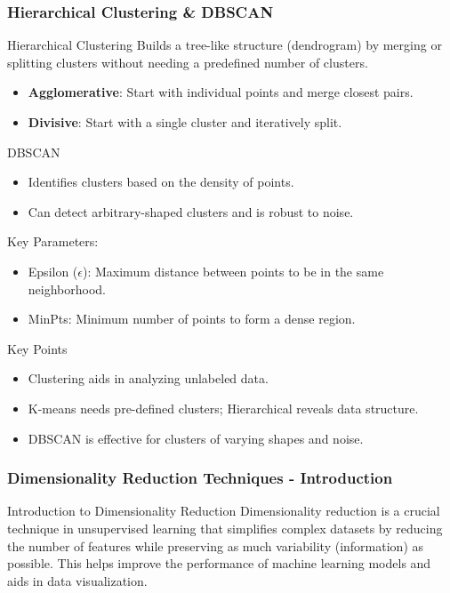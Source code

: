 \documentclass[aspectratio=169]{beamer}
\begin{document}
\begin{frame}[fragile]
    \frametitle{Hierarchical Clustering & DBSCAN}
    \begin{block}{Hierarchical Clustering}
        Builds a tree-like structure (dendrogram) by merging or splitting clusters without needing a predefined number of clusters.
        \begin{itemize}
            \item \textbf{Agglomerative}: Start with individual points and merge closest pairs.
            \item \textbf{Divisive}: Start with a single cluster and iteratively split.
        \end{itemize}
    \end{block}

    \begin{block}{DBSCAN}
        \begin{itemize}
            \item Identifies clusters based on the density of points.
            \item Can detect arbitrary-shaped clusters and is robust to noise.
        \end{itemize}
        Key Parameters:
        \begin{itemize}
            \item Epsilon ($\epsilon$): Maximum distance between points to be in the same neighborhood.
            \item MinPts: Minimum number of points to form a dense region.
        \end{itemize}
    \end{block}
    
    \begin{block}{Key Points}
        \begin{itemize}
            \item Clustering aids in analyzing unlabeled data.
            \item K-means needs pre-defined clusters; Hierarchical reveals data structure.
            \item DBSCAN is effective for clusters of varying shapes and noise.
        \end{itemize}
    \end{block}
\end{frame}

\begin{frame}[fragile]
    \frametitle{Dimensionality Reduction Techniques - Introduction}
    \begin{block}{Introduction to Dimensionality Reduction}
        Dimensionality reduction is a crucial technique in unsupervised learning that simplifies complex datasets by reducing the number of features while preserving as much variability (information) as possible. This helps improve the performance of machine learning models and aids in data visualization.
    \end{block}
\end{frame}
\end{document}

